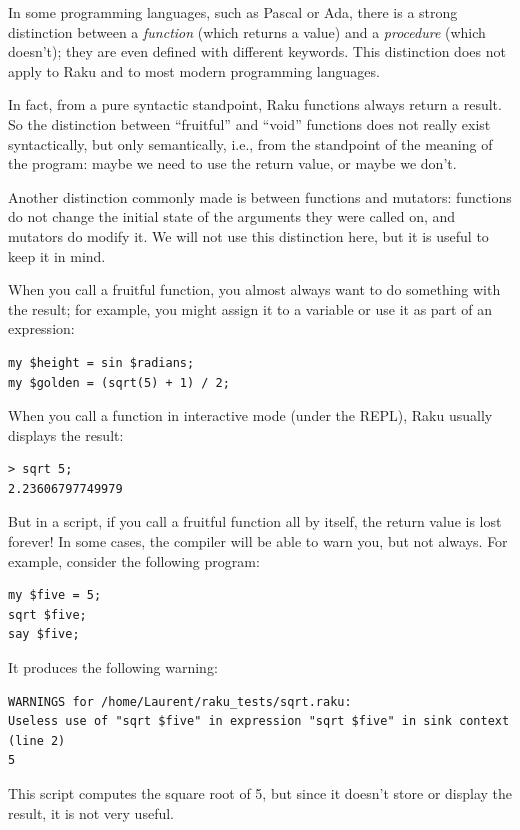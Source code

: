 In some programming languages, such as Pascal or Ada, there 
is a strong distinction between a \emph{function} (which 
returns a value) and a \emph{procedure} (which doesn't); 
they are even defined with different keywords. This 
distinction does not apply to Raku and to most modern 
programming languages.

In fact, from a pure syntactic standpoint, Raku functions 
always return a result. So the distinction between 
``fruitful'' and ``void'' functions does not really exist 
syntactically, but only semantically, i.e., from the 
standpoint of the meaning of the program: maybe we need to 
use the return value, or maybe we don't.

Another distinction commonly made is between functions and 
mutators: functions do not change the initial state of the 
arguments they were called on, and mutators do modify it. We 
will not use this distinction here, but it is useful to 
keep it in mind.

When you call a fruitful function, you almost always
want to do something with the result; for example, you might
assign it to a variable or use it as part of an expression:

\begin{verbatim}
my $height = sin $radians;
my $golden = (sqrt(5) + 1) / 2;
\end{verbatim}
%
When you call a function in interactive mode (under the 
REPL), Raku usually displays the result:

\begin{verbatim}
> sqrt 5;
2.23606797749979
\end{verbatim}
%
But in a script, if you call a fruitful function all by 
itself, the return value is lost forever! In some cases, the 
compiler will be able to warn you, but not always. For example, 
consider the following program:

\begin{verbatim}
my $five = 5;
sqrt $five;
say $five;
\end{verbatim}

It produces the following warning:

\begin{verbatim}
WARNINGS for /home/Laurent/raku_tests/sqrt.raku:
Useless use of "sqrt $five" in expression "sqrt $five" in sink context (line 2)
5
\end{verbatim}
%
This script computes the square root of 5, but since 
it doesn't store or display the result, it is not very useful.


